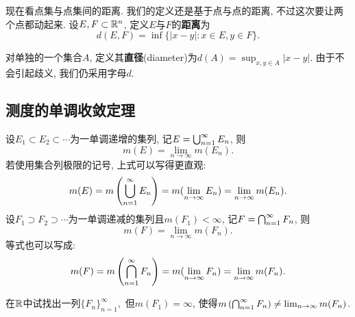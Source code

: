 现在看点集与点集间的距离. 我们的定义还是基于点与点的距离, 不过这次要让两个点都动起来. 设$E,F \subset \mathbb{R}^n$, 定义$E$与$F$的\textbf{距离}为
$$d(E,F) = \inf\{|x-y|: x \in E, y \in F\}.$$

对单独的一个集合$A$, 定义其\textbf{直径}(diameter)为$d(A) = \sup_{x,y \in A} |x-y|$. 由于不会引起歧义, 我们仍采用字母$d$. 
\subsection{测度的单调收敛定理}
设$E_1 \subset E_2 \subset \cdots $为一单调递增的集列, 记$E = \bigcup_{n=1}^{\infty}E_n$, 则
$$m(E)=\lim_{n \to \infty}m(E_n).$$
若使用集合列极限的记号, 上式可以写得更直观:
$$m(E)=m\left(\bigcup_{n=1}^{\infty}E_n\right)=m(\lim_{n \to \infty}E_n) = \lim_{n \to \infty}m(E_n).$$
设$F_1 \supset F_2 \supset \cdots $为一单调递减的集列且$m(F_1)<\infty$,
记$F = \bigcap_{n=1}^{\infty}F_n$, 则
$$m(F)=\lim_{n \to \infty}m(F_n).$$
等式也可以写成:
$$m(F)=m\left(\bigcap_{n=1}^{\infty}F_n\right)=m(\lim_{n \to \infty}F_n) = \lim_{n \to \infty}m(F_n).$$
\begin{exercise}
    在$\mathbb{R}$中试找出一列$\{F_n\}_{n=1}^\infty,$ 但$m(F_1)=\infty$, 
    使得$m\left(\bigcap_{n=1}^{\infty}F_n\right) \neq \lim_{n \to \infty}m(F_n)$.
\end{exercise}


